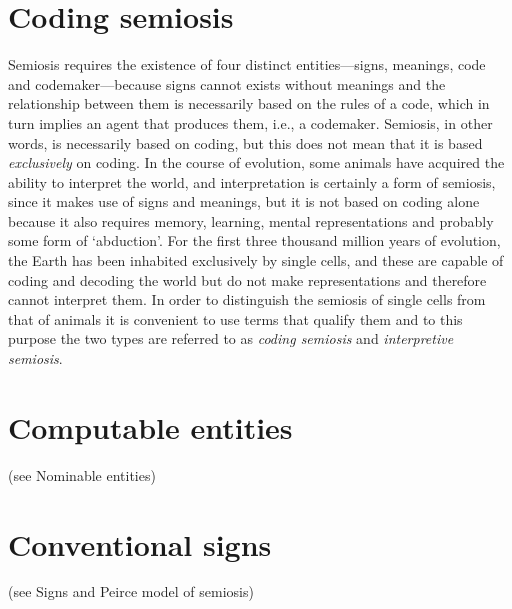 \documentclass[12pt]{article}
\begin{document}
\section{Coding semiosis }
Semiosis requires the existence of four distinct entities---signs, meanings, code and codemaker---because signs cannot exists without meanings and the relationship between them is necessarily based on the rules of a code, which in turn implies an agent that produces them, i.e., a codemaker. Semiosis, in other words, is necessarily based on coding, but this does not mean that it is based \textit{exclusively} on coding. In the course of evolution, some animals have acquired the ability to interpret the world, and interpretation is certainly a form of semiosis, since it makes use of signs and meanings, but it is not based on coding alone because it also requires memory, learning, mental representations and probably some form of `abduction'. For the first three thousand million years of evolution, the Earth has been inhabited exclusively by single cells, and these are capable of coding and decoding the world but do not make representations and therefore cannot interpret them. In order to distinguish the semiosis of single cells from that of animals it is convenient to use terms that qualify them and to this purpose the two types are referred to as \textit{coding semiosis} and \textit{interpretive semiosis}.


\section{Computable entities} (see Nominable entities)


\section{Conventional signs} (see Signs and Peirce model of semiosis)
\end{document}
